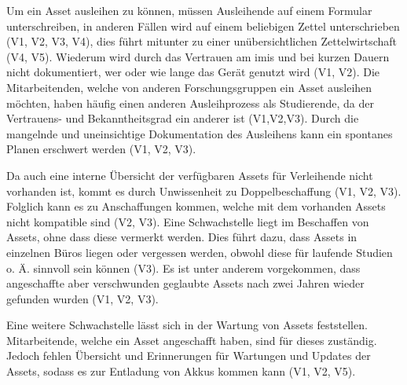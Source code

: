 Um ein Asset ausleihen zu können, müssen Ausleihende auf einem Formular unterschreiben, in anderen
Fällen wird auf einem beliebigen Zettel unterschrieben (V1, V2, V3, V4), dies führt mitunter zu einer
unübersichtlichen Zettelwirtschaft (V4, V5). Wiederum wird durch das Vertrauen am \ac{imis} und bei
kurzen Dauern nicht dokumentiert, wer oder wie lange das Gerät genutzt wird (V1, V2). Die
Mitarbeitenden, welche von anderen Forschungsgruppen ein Asset ausleihen möchten, haben häufig einen
anderen Ausleihprozess als Studierende, da der Vertrauens- und Bekanntheitsgrad ein anderer ist
(V1,V2,V3). Durch die mangelnde und uneinsichtige Dokumentation des Ausleihens kann ein spontanes
Planen erschwert werden (V1, V2, V3).

Da auch eine interne Übersicht der verfügbaren Assets für Verleihende nicht vorhanden ist, kommt es
durch Unwissenheit zu Doppelbeschaffung (V1, V2, V3). Folglich kann es zu Anschaffungen kommen,
welche mit dem vorhanden Assets nicht kompatible sind (V2, V3). Eine Schwachstelle liegt im
Beschaffen von Assets, ohne dass diese vermerkt werden. Dies führt dazu, dass Assets in einzelnen
Büros liegen oder vergessen werden, obwohl diese für laufende Studien o. Ä. sinnvoll sein können
(V3). Es ist unter anderem vorgekommen, dass angeschaffte aber verschwunden geglaubte Assets nach
zwei Jahren wieder gefunden wurden (V1, V2, V3).

Eine weitere Schwachstelle lässt sich in der Wartung von Assets feststellen. Mitarbeitende, welche
ein Asset angeschafft haben, sind für dieses zuständig. Jedoch fehlen Übersicht und Erinnerungen für
Wartungen und Updates der Assets, sodass es zur Entladung von Akkus kommen kann (V1, V2, V5).

